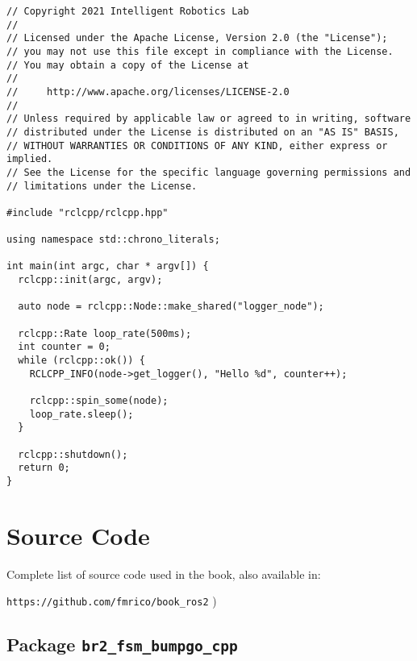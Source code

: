  \footnotesize
\begin{tcolorbox}[sharp corners, colframe=gray!80, colback=LightGray, left=0pt, top=0pt, bottom=0pt, title=\texttt{br2\_basics/src/logger.cpp}]
  \begin{verbatim}
// Copyright 2021 Intelligent Robotics Lab
//
// Licensed under the Apache License, Version 2.0 (the "License");
// you may not use this file except in compliance with the License.
// You may obtain a copy of the License at
//
//     http://www.apache.org/licenses/LICENSE-2.0
//
// Unless required by applicable law or agreed to in writing, software
// distributed under the License is distributed on an "AS IS" BASIS,
// WITHOUT WARRANTIES OR CONDITIONS OF ANY KIND, either express or implied.
// See the License for the specific language governing permissions and
// limitations under the License.

#include "rclcpp/rclcpp.hpp"  

using namespace std::chrono_literals;

int main(int argc, char * argv[]) { 
  rclcpp::init(argc, argv);  

  auto node = rclcpp::Node::make_shared("logger_node");  

  rclcpp::Rate loop_rate(500ms);
  int counter = 0;
  while (rclcpp::ok()) {
    RCLCPP_INFO(node->get_logger(), "Hello %d", counter++);

    rclcpp::spin_some(node);
    loop_rate.sleep();
  }

  rclcpp::shutdown();  
  return 0;  
}     \end{verbatim}
    \end{tcolorbox}
  \normalsize



\appendix

\chapter[Source Code]{Source Code}
\label{cap:source}
Complete list of source code used in the book, also available in:

\vspace{0.5cm}
\large
\texttt{https://github.com/fmrico/book\_ros2}
\normalsize
)
\section{Package \texttt{br2\_fsm\_bumpgo\_cpp}}
\label{sec:anex:br2_fsm_bumpgo_cpp}

